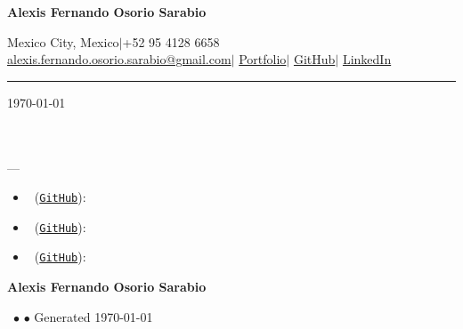 \documentclass[11pt,a4paper]{article}
\newcommand{\showcrypto}[1]{\ifcryptoengineer#1\fi}
\newcommand{\showsecurity}[1]{\ifsecurityengineer#1\fi}
\newcommand{\showsoftware}[1]{\ifsoftwareengineer#1\fi}
\newcommand{\showapplied}[1]{\ifappliedcrypto#1\fi}
\newcommand{\showgeneral}[1]{\ifgeneralapplication#1\fi}
\newcommand{\showengineering}[1]{\ifcryptoengineer#1\else\ifsecurityengineer#1\else\ifsoftwareengineer#1\fi\fi\fi}
\newcommand{\openingparagraph}{%
    \showcrypto{\openingBodyCrypto}
    \showsecurity{\openingBodySecurity}
    \showsoftware{\openingBodySoftware}
    \showapplied{\openingBodyApplied}
    \showgeneral{\openingBodyGeneral}
}
\newcommand{\requirementsparagraph}{\requirementsTemplate}
\newcommand{\projectdescriptions}{%
    \begin{itemize}
        \setlength{\itemsep}{4pt}

        \ifprojectone
            \item \textbf{\ProjectNameOne}
                \ (\href{\ProjectURLOne}{\texttt{GitHub}}):\\
                \ProjectDescOne
        \fi

        \ifprojecttwo
            \item \textbf{\ProjectNameTwo}
                \ (\href{\ProjectURLTwo}{\texttt{GitHub}}):\\
                \ProjectDescTwo
        \fi

        \ifprojectthree
            \item \textbf{\ProjectNameThree}
                \ (\href{\ProjectURLThree}{\texttt{GitHub}}):\\
                \ProjectDescThree
        \fi
    \end{itemize}%
}
\newcommand{\closingstatement}{%
    \showengineering{\closingBodyEngineering}
    \showapplied{\closingBodyApplied}
    \showgeneral{\closingBodyGeneral}

    \ifx\ClosingNote\empty\else
        \par\ClosingNote%
    \fi

    \par
    \closingLine%
}
\begin{document}
\begin{center}
    {\LARGE \textbf{Alexis Fernando Osorio Sarabio}}\\[4pt]
    \showcrypto{\large\textit{\roleTitleCrypto}}
    \showsecurity{\large\textit{\roleTitleSecurity}}
    \showsoftware{\large\textit{\roleTitleSoftware}}
    \showapplied{\large\textit{\roleTitleApplied}}
    \showgeneral{\large\textit{\roleTitleGeneral}}

    \vspace{6pt}

    \normalsize
    Mexico City, Mexico\quad$|$\quad+52 95 4128 6658\\
    \href{mailto:alexis.fernando.osorio.sarabio@gmail.com}{alexis.fernando.osorio.sarabio@gmail.com}\quad$|$\quad
    \href{https://fer-osorio.github.io/security-portfolio}{Portfolio}\quad$|$\quad
    \href{https://github.com/fer-osorio}{GitHub}\quad$|$\quad
    \href{https://www.linkedin.com/in/fernando-osorio-0b755b346}{LinkedIn}
\end{center}

\vspace{10pt}
\hrule
\vspace{14pt}

\today

\vspace{8pt}

\textbf{\CompanyName}%
\ifx\PositionTitle\empty
    \\\talentTeam%
\else
    \\\hiringTeamLabel{} --- \textbf{\PositionTitle}%
\fi

\vspace{8pt}

\salutation

\vspace{4pt}

\openingparagraph

\requirementsparagraph

\projectdescriptions

\closingstatement

\vspace{18pt}

\signOff

\vspace{12pt}

\textbf{Alexis Fernando Osorio Sarabio}

\vfill
\begin{center}
    \scriptsize
    \showcrypto{\textbf{\roleTitleCrypto}}
    \showsecurity{\textbf{\roleTitleSecurity}}
    \showsoftware{\textbf{\roleTitleSoftware}}
    \showapplied{\textbf{\roleTitleApplied}}
    \showgeneral{\textbf{\roleTitleGeneral}}
    \ $\bullet$ \textbf{\CompanyName} $\bullet$ Generated \today
\end{center}
\end{document}
